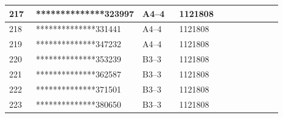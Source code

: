 \documentclass[UTF8,10pt,a4paper,fontset=fandol]{ctexart}
\newcommand{\fieldvalue}[1]{#1}
\begin{document}
\begin{center}
\begin{tabular}{|p{0.10\linewidth}|p{0.25\linewidth}|p{0.14\linewidth}|p{0.24\linewidth}|p{0.16\linewidth}|}
\fieldvalue{217} &
\fieldvalue{**************323997} &
\fieldvalue{A4--4} &
\fieldvalue{1121808} & \\ \hline

\fieldvalue{218} &
\fieldvalue{**************331441} &
\fieldvalue{A4--4} &
\fieldvalue{1121808} & \\ \hline

\fieldvalue{219} &
\fieldvalue{**************347232} &
\fieldvalue{A4--4} &
\fieldvalue{1121808} & \\ \hline

\fieldvalue{220} &
\fieldvalue{**************353239} &
\fieldvalue{B3--3} &
\fieldvalue{1121808} & \\ \hline

\fieldvalue{221} &
\fieldvalue{**************362587} &
\fieldvalue{B3--3} &
\fieldvalue{1121808} & \\ \hline

\fieldvalue{222} &
\fieldvalue{**************371501} &
\fieldvalue{B3--3} &
\fieldvalue{1121808} & \\ \hline

\fieldvalue{223} &
\fieldvalue{**************380650} &
\fieldvalue{B3--3} &
\fieldvalue{1121808} & \\ \hline


\end{tabular}
\end{center}
\end{document}
